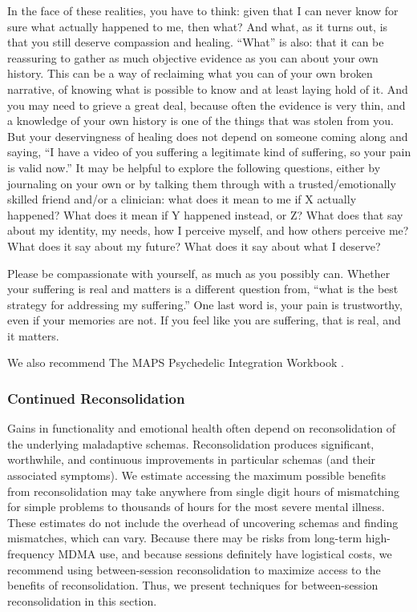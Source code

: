 \documentclass[12pt,letterpaper]{article}
\begin{document}
In the face of these realities, you have to think: given that I can never know for sure what actually happened to me, then what?  And what, as it turns out, is that you still deserve compassion and healing.  “What” is also: that it can be reassuring to gather as much objective evidence as you can about your own history. This can be a way of reclaiming what you can of your own broken narrative, of knowing what is possible to know and at least laying hold of it. And you may need to grieve a great deal, because often the evidence is very thin, and a knowledge of your own history is one of the things that was stolen from you. But your deservingness of healing does not depend on someone coming along and saying, “I have a video of you suffering a legitimate kind of suffering, so your pain is valid now.” It may be helpful to explore the following questions, either by journaling on your own or by talking them through with a trusted/emotionally skilled friend and/or a clinician: what does it mean to me if X actually happened? What does it mean if Y happened instead, or Z? What does that say about my identity, my needs, how I perceive myself, and how others perceive me? What does it say about my future? What does it say about what I deserve?

Please be compassionate with yourself, as much as you possibly can. Whether your suffering is real and matters is a different question from, “what is the best strategy for addressing my suffering.” One last word is, your pain is trustworthy, even if your memories are not. If you feel like you are suffering, that is real, and it matters.

We also recommend The MAPS Psychedelic Integration Workbook \cite{integrationHandbook}. 
\subsubsection{Continued Reconsolidation}
Gains in functionality and emotional health often depend on reconsolidation of the underlying maladaptive schemas. Reconsolidation produces significant, worthwhile, and continuous improvements in particular schemas (and their associated symptoms). We estimate accessing the maximum possible benefits from reconsolidation may take anywhere from single digit hours of mismatching for simple problems to thousands of hours for the most severe mental illness. These estimates do not include the overhead of uncovering schemas and finding mismatches, which can vary. Because there may be risks from long-term high-frequency MDMA use, and because sessions definitely have logistical costs, we recommend using between-session reconsolidation to maximize access to the benefits of reconsolidation.  Thus, we present techniques for between-session reconsolidation in this section.
\end{document}
